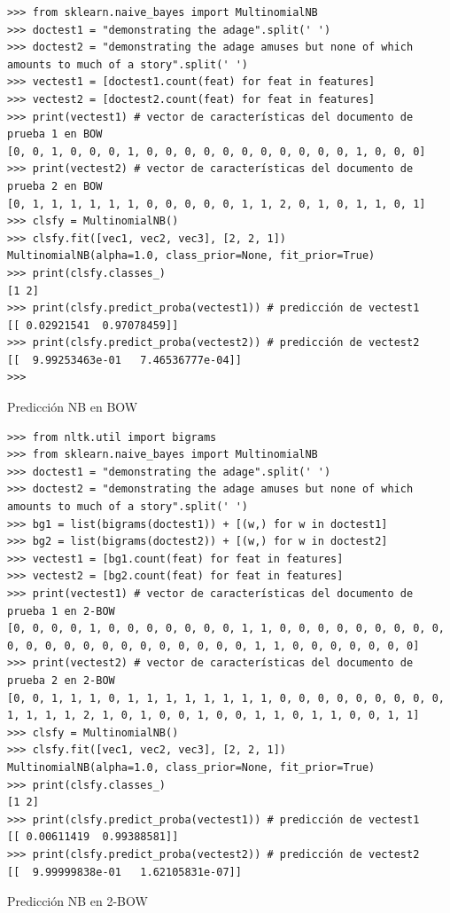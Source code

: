 \begin{listing}[htbp]
\begin{verbatim}
>>> from sklearn.naive_bayes import MultinomialNB 
>>> doctest1 = "demonstrating the adage".split(' ')
>>> doctest2 = "demonstrating the adage amuses but none of which amounts to much of a story".split(' ')
>>> vectest1 = [doctest1.count(feat) for feat in features]
>>> vectest2 = [doctest2.count(feat) for feat in features]
>>> print(vectest1) # vector de características del documento de prueba 1 en BOW
[0, 0, 1, 0, 0, 0, 1, 0, 0, 0, 0, 0, 0, 0, 0, 0, 0, 0, 1, 0, 0, 0]
>>> print(vectest2) # vector de características del documento de prueba 2 en BOW
[0, 1, 1, 1, 1, 1, 1, 0, 0, 0, 0, 0, 1, 1, 2, 0, 1, 0, 1, 1, 0, 1]
>>> clsfy = MultinomialNB()
>>> clsfy.fit([vec1, vec2, vec3], [2, 2, 1])
MultinomialNB(alpha=1.0, class_prior=None, fit_prior=True)
>>> print(clsfy.classes_)
[1 2]
>>> print(clsfy.predict_proba(vectest1)) # predicción de vectest1
[[ 0.02921541  0.97078459]]
>>> print(clsfy.predict_proba(vectest2)) # predicción de vectest2
[[  9.99253463e-01   7.46536777e-04]]
>>> 
\end{verbatim}
\caption{Predicción NB en BOW}
\label{lst:multinb-bow}
\end{listing}

\begin{listing}[htbp]
\begin{verbatim}
>>> from nltk.util import bigrams
>>> from sklearn.naive_bayes import MultinomialNB 
>>> doctest1 = "demonstrating the adage".split(' ')
>>> doctest2 = "demonstrating the adage amuses but none of which amounts to much of a story".split(' ')
>>> bg1 = list(bigrams(doctest1)) + [(w,) for w in doctest1]
>>> bg2 = list(bigrams(doctest2)) + [(w,) for w in doctest2]
>>> vectest1 = [bg1.count(feat) for feat in features]
>>> vectest2 = [bg2.count(feat) for feat in features]
>>> print(vectest1) # vector de características del documento de prueba 1 en 2-BOW
[0, 0, 0, 0, 1, 0, 0, 0, 0, 0, 0, 0, 1, 1, 0, 0, 0, 0, 0, 0, 0, 0, 0, 0, 0, 0, 0, 0, 0, 0, 0, 0, 0, 0, 0, 0, 1, 1, 0, 0, 0, 0, 0, 0, 0]
>>> print(vectest2) # vector de características del documento de prueba 2 en 2-BOW
[0, 0, 1, 1, 1, 0, 1, 1, 1, 1, 1, 1, 1, 1, 0, 0, 0, 0, 0, 0, 0, 0, 0, 1, 1, 1, 1, 2, 1, 0, 1, 0, 0, 1, 0, 0, 1, 1, 0, 1, 1, 0, 0, 1, 1]
>>> clsfy = MultinomialNB()
>>> clsfy.fit([vec1, vec2, vec3], [2, 2, 1])
MultinomialNB(alpha=1.0, class_prior=None, fit_prior=True)
>>> print(clsfy.classes_)
[1 2]
>>> print(clsfy.predict_proba(vectest1)) # predicción de vectest1
[[ 0.00611419  0.99388581]]
>>> print(clsfy.predict_proba(vectest2)) # predicción de vectest2
[[  9.99999838e-01   1.62105831e-07]]
\end{verbatim}
\caption{Predicción NB en 2-BOW}
\label{lst:multinb-2bow}
\end{listing}

